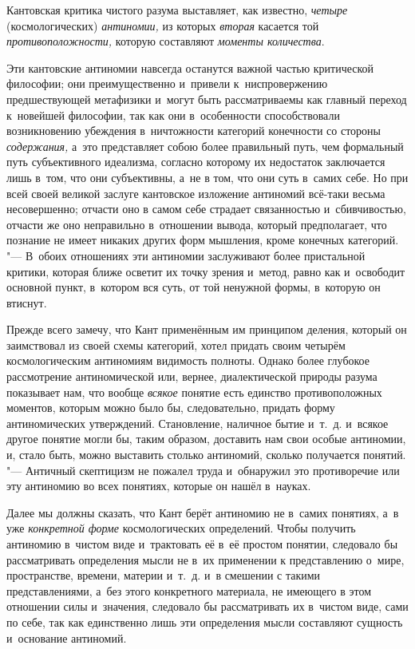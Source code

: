 Кантовская критика чистого разума выставляет, как известно, {\em четыре}
(космологических) {\em антиномии,} из которых {\em вторая} касается той
{\em противоположности,} которую составляют {\em моменты количества}.

Эти кантовские антиномии навсегда останутся важной частью критической
философии; они преимущественно и~привели к~ниспровержению предшествующей
метафизики и~могут быть рассматриваемы как главный переход к~новейшей
философии, так как они в~особенности способствовали возникновению убеждения
в~ничтожности категорий конечности со стороны
{\em содержания,} а~это представляет собою более
правильный путь, чем формальный путь субъективного идеализма, согласно
которому их недостаток заключается лишь в~том, что они субъективны, а~не в
том, что они суть в~самих себе. Но при всей своей великой заслуге
кантовское изложение антиномий всё-таки весьма несовершенно; отчасти оно в
самом себе страдает связанностью и~сбивчивостью, отчасти же оно неправильно
в~отношении вывода, который предполагает, что познание не имеет никаких
других форм мышления, кроме конечных категорий. "--- В~обоих отношениях эти
антиномии заслуживают более пристальной критики, которая ближе осветит их
точку зрения и~метод, равно как и~освободит основной пункт, в~котором вся
суть, от той ненужной формы, в~которую он втиснут.

Прежде всего замечу, что Кант применённым им принципом деления, который он
заимствовал из своей схемы категорий, хотел придать своим четырём
космологическим антиномиям видимость полноты. Однако более глубокое
рассмотрение антиномической или, вернее, диалектической природы разума
показывает нам, что вообще {\em всякое} понятие есть
единство противоположных моментов, которым можно было бы, следовательно,
придать форму антиномических утверждений. Становление, наличное бытие
и~т.~д. и~всякое другое понятие могли бы, таким образом, доставить нам свои
особые антиномии, и, стало быть, можно выставить столько антиномий, сколько
получается понятий. "--- Античный скептицизм не пожалел труда и~обнаружил это
противоречие или эту антиномию во всех понятиях, которые он нашёл в~науках.

Далее мы должны сказать, что Кант берёт антиномию не в~самих понятиях, а~в
уже {\em конкретной форме} космологических определений.
Чтобы получить антиномию в~чистом виде и~трактовать её в~её простом
понятии, следовало бы рассматривать определения мысли не в~их применении к
представлению о~мире, пространстве, времени, материи и~т.~д. и~в смешении с
такими представлениями, а~без этого конкретного материала, не имеющего в
этом отношении силы и~значения, следовало бы рассматривать их в~чистом
виде, сами по себе, так как единственно лишь эти определения мысли
составляют сущность и~основание антиномий.

